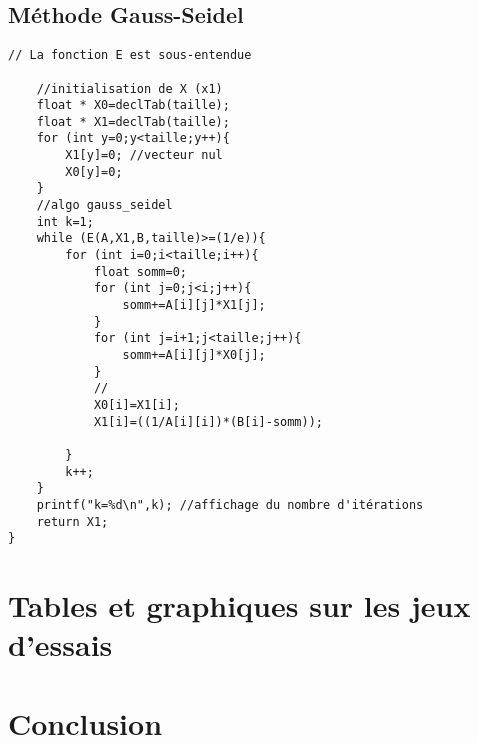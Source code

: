 \documentclass[10pt,a4paper,french]{article}
\begin{document}
\subsection{Méthode Gauss-Seidel}
\begin{lstlisting}
// La fonction E est sous-entendue

    //initialisation de X (x1)
    float * X0=declTab(taille);
    float * X1=declTab(taille);
    for (int y=0;y<taille;y++){
        X1[y]=0; //vecteur nul
        X0[y]=0;
    }
    //algo gauss_seidel
    int k=1;
    while (E(A,X1,B,taille)>=(1/e)){
        for (int i=0;i<taille;i++){
            float somm=0;
            for (int j=0;j<i;j++){
                somm+=A[i][j]*X1[j];
            }
            for (int j=i+1;j<taille;j++){
                somm+=A[i][j]*X0[j];
            }
            //
            X0[i]=X1[i];
            X1[i]=((1/A[i][i])*(B[i]-somm));
            
        }
        k++;
    }
    printf("k=%d\n",k); //affichage du nombre d'itérations
    return X1;
}
\end{lstlisting}
\section{Tables et graphiques sur les jeux d'essais}
\section{Conclusion}
\end{document}
